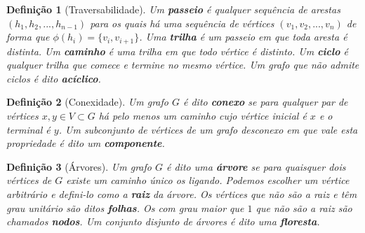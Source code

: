 \documentclass{beamer} %
\newtheorem{defi}{Definição}
\newcommand{\1}{\mathbb{I}}
\begin{document}
\begin{frame}

\begin{defi}[Traversabilidade]
Um \textbf{passeio} é qualquer sequência de arestas $(h_1, h_2, ..., h_{n-1})$ para os quais há uma sequência de vértices $(v_1, v_2, ..., v_n)$ de forma que $\phi(h_i) = \{v_i, v_{i+1}\}$. Uma \textbf{trilha} é um passeio em que toda aresta é distinta. Um \textbf{caminho} é uma trilha em que todo vértice é distinto. Um \textbf{ciclo} é qualquer trilha que comece e termine no mesmo vértice. Um grafo que não admite ciclos é dito \textbf{acíclico}.
\end{defi}
\end{frame}

\begin{frame}
\begin{defi}[Conexidade]
Um grafo $G$ é dito \textbf{conexo} se para qualquer par de vértices $x, y \in V \subset G$ há pelo menos um caminho cujo vértice inicial é $x$ e o terminal é $y$. Um subconjunto de vértices de um grafo desconexo em que vale esta propriedade é dito um \textbf{componente}.
\end{defi}
    
\end{frame}



\begin{frame}

\begin{defi}[Árvores]
Um grafo $G$ é dito uma \textbf{árvore} se para quaisquer dois vértices de $G$ existe um caminho único os ligando. Podemos escolher um vértice arbitrário e defini-lo como a \textbf{raiz} da árvore. Os vértices que não são a raiz e têm grau unitário são ditos \textbf{folhas}. Os com grau maior que $1$ que não são a raiz são chamados \textbf{nodos}. Um conjunto disjunto de árvores é dito uma \textbf{floresta}.
\end{defi}

    
\end{frame}

\begin{frame}
    \begin{figure}[H]
    \centering
       \label{fig:grafos}
\end{figure}
\end{frame}
\end{document}
